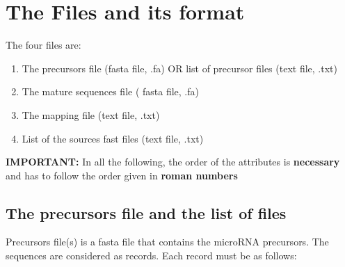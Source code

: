 \documentclass[a4paper,20pt]{report}
\begin{document}
\section{The Files and its format}
The four files are:
\begin{enumerate}
 \item The precursors file (fasta file, .fa) OR list of precursor files (text file, .txt)
 \item The mature sequences file ( fasta file, .fa)
 \item The mapping file (text file, .txt)
 \item List of the sources fast files (text file, .txt)
\end{enumerate}
 \textbf{IMPORTANT:} In all the following, the order of the attributes is \textbf{necessary} and has to follow the 
 order given in \textbf{roman numbers}
\subsection{The precursors file and the list of files}
\label{sec:fastafile}
\noindent
Precursors file(s) is a fasta file that contains the microRNA precursors. The sequences are considered
as records. Each record must be as follows:\\
\end{document}
